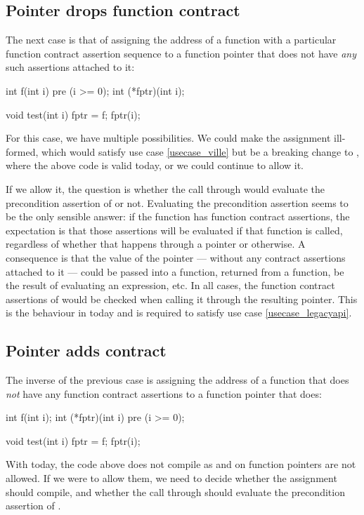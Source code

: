 
\subsection{Pointer drops function contract}
\label{dropping}

The next case is that of assigning the address of a function with a particular function contract assertion sequence to a function pointer that does not have \emph{any} such assertions attached to it:
\begin{codeblock}
int f(int i) pre (i >= 0);
int (*fptr)(int i);

void test(int i) {
  fptr = f; 
  fptr(i); 
}
\end{codeblock}
For this case, we have multiple possibilities. We could make the assignment ill-formed, which would satisfy use case \ref{usecase_ville} but be a breaking change to \cite{P2900R8}, where the above code is valid today, or we could continue to allow it.

If we allow it, the question is whether the call through  would evaluate the precondition assertion of  or not. Evaluating the precondition assertion seems to be the only sensible answer: if the function  has function contract assertions, the expectation is that those assertions will be evaluated if that function is called, regardless of whether that happens through a pointer or otherwise. A consequence is that the value of the pointer  --- without any contract assertions attached to it --- could be passed into a function, returned from a function, be the result of evaluating an expression, etc. In all cases, the function contract assertions of  would be checked when calling it through the resulting pointer. This is the behaviour in \cite{P2900R8} today and is required to satisfy use case \ref{usecase_legacyapi}.


\subsection{Pointer adds contract}
\label{adding}

The inverse of the previous case is assigning the address of a function that does \emph{not} have any function contract assertions to a function pointer that does:
\begin{codeblock}
int f(int i);
int (*fptr)(int i)  pre (i >= 0);

void test(int i) {
  fptr = f;
  fptr(i); 
}
\end{codeblock}
With \cite{P2900R8} today, the code above does not compile as  and  on function pointers are not allowed. If we were to allow them, we need to decide whether the assignment should compile, and whether the call through  should evaluate the precondition assertion of .

